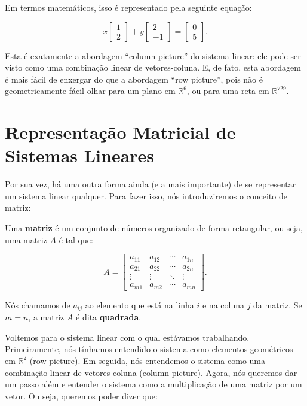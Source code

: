 Em termos matemáticos, isso é representado pela seguinte equação:

$$
x\begin{bmatrix} 1 \\ 2 \end{bmatrix} + y\begin{bmatrix} 2 \\ -1 \end{bmatrix} = \begin{bmatrix} 0 \\ 5 \end{bmatrix}.
$$

Esta é exatamente a abordagem ``column picture'' do sistema linear: ele pode ser visto como uma combinação linear de vetores-coluna. E, de fato, esta abordagem é mais fácil de enxergar do que a abordagem ``row picture'', pois não é geometricamente fácil olhar para um plano em $\mathbb{R}^6$, ou para uma reta em $\mathbb{R}^{729}$.

\section{Representação Matricial de Sistemas Lineares}

Por sua vez, há uma outra forma ainda (e a mais importante) de se representar um sistema linear qualquer. Para fazer isso, nós introduziremos o conceito de matriz:

\begin{Definition}[Matriz]
	Uma \textbf{matriz} é um conjunto de números organizado de forma retangular, ou seja, uma matriz $A$ é tal que:
	
	$$
	A = \begin{bmatrix}
		a_{11} & a_{12} & \cdots & a_{1n} \\
		a_{21} & a_{22} & \cdots & a_{2n} \\
		\vdots & \vdots & \ddots & \vdots \\
		a_{m1} & a_{m2} & \cdots & a_{mn}
	\end{bmatrix}.
	$$
\end{Definition}

Nós chamamos de $a_{ij}$ ao elemento que está na linha $i$ e na coluna $j$ da matriz. Se $m = n$, a matriz $A$ é dita \textbf{quadrada}.

Voltemos para o sistema linear com o qual estávamos trabalhando. Primeiramente, nós tínhamos entendido o sistema como elementos geométricos em $\mathbb{R}^2$ (row picture). Em seguida, nós entendemos o sistema como uma combinação linear de vetores-coluna (column picture). Agora, nós queremos dar um passo além e entender o sistema como a multiplicação de uma matriz por um vetor. Ou seja, queremos poder dizer que:

